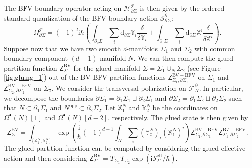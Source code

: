 \documentclass[11pt,colorinlistoftodos]{amsart}
\numberwithin{equation}{subsection}
\theoremstyle{plain}
\theoremstyle{definition}
\theoremstyle{remark}
\newcommand{\dd}{{\mathrm{d}}}
\newcommand{\de}{\partial}
\newcommand{\calH}{\mathcal{H}}
\newcommand{\calS}{\mathcal{S}}
\newcommand{\calP}{\mathcal{P}}
\newcommand{\calF}{\mathcal{F}}
\newcommand{\I}{\mathrm{i}}
\begin{document}
The BFV boundary operator acting on $\calH^\calP_{\de\Sigma}$ is then given by the ordered standard quantization of the BFV boundary action $\calS^\de_{\de\Sigma}$:
\[
\Omega^\calP_{\de\Sigma}=(-1)^d\I\hbar\left(\int_{\de_2\Sigma}\sum_i\dd_{\de\Sigma}\mathds{Y}_i\frac{\delta}{\delta\mathds{Y}_i}+\int_{\de_1\Sigma}\sum_i\dd_{\de\Sigma}\mathds{X}^i\frac{\delta}{\delta\mathds{X}^i}\right).
\]
Suppose now that we have two smooth $d$-manifolds $\Sigma_1$ and $\Sigma_2$ with common boundary component $(d-1)$-manifold $N$. We can then compute the glued partition function $\mathsf{Z}^{\scriptscriptstyle\mathrm{BV}}_\Sigma$ for the glued  manifold $\Sigma=\Sigma_1\cup_N\Sigma_2$ (see Figure \ref{fig:gluing_1}) out of the BV-BFV partition functions $\mathsf{Z}^{\scriptscriptstyle\mathrm{BV-BFV}}_{\Sigma_1,\de\Sigma_1}$ on $\Sigma_1$ and $\mathsf{Z}^{\scriptscriptstyle\mathrm{BV-BFV}}_{\Sigma_2,\de\Sigma_2}$ on $\Sigma_2$. We consider the transversal polarization on $\calF^\de_{N}$. In particular, we decompose the boundaries $\de\Sigma_1=\de_1\Sigma_1\sqcup\de_2\Sigma_1$ and $\de\Sigma_2=\de_1\Sigma_2\sqcup\de_2\Sigma_2$ such that $N\subset \de_1\Sigma_1$ and $N^\mathrm{opp}\subset\de_2\Sigma_2$. Let $\mathds{X}^N_1$ and $\mathds{Y}^N_2$ be the coordinates on $\Omega^\bullet(N)[1]$ and $\Omega^\bullet(N)[d-2]$, respectively. The glued state is then given by 
\[
\mathsf{Z}^{\scriptscriptstyle\mathrm{BV}}_\Sigma=\int_{\{\mathds{X}^N_1,\mathds{Y}^N_2\}}\exp\left(\frac{\I}{\hbar}(-1)^{d-1}\int_N\sum_i(\mathds{Y}^N_2)_i(\mathds{X}^N_1)^i\right)\mathsf{Z}^{\scriptscriptstyle\mathrm{BV-BFV}}_{\Sigma_1,\de\Sigma_1}\mathsf{Z}^{\scriptscriptstyle\mathrm{BV-BFV}}_{\Sigma_2,\de\Sigma_2}.
\]
The glued partition function can be computed by considering the glued effective action and then considering $\mathsf{Z}^{\scriptscriptstyle\mathrm{BV}}_\Sigma=T_{\Sigma_1}T_{\Sigma_2}\exp(\I\calS^\mathrm{eff}_\Sigma/\hbar)$.
\end{document}
